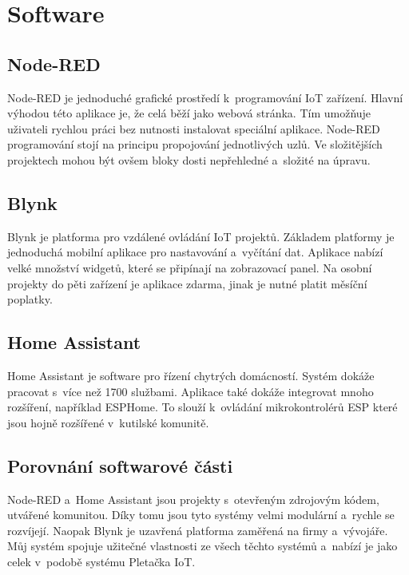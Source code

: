 \newpage

\section{Software}


\subsection{Node-RED}
Node-RED je jednoduché grafické prostředí k~programování IoT zařízení. 
Hlavní výhodou této aplikace je, že celá běží jako webová stránka. 
Tím umožňuje uživateli rychlou práci bez nutnosti instalovat speciální aplikace.
Node-RED programování stojí na principu propojování jednotlivých uzlů.
Ve složitějších projektech mohou být ovšem bloky dosti nepřehledné a~složité na úpravu.


\subsection{Blynk}
Blynk je platforma pro vzdálené ovládání IoT projektů.
Základem platformy je jednoduchá mobilní aplikace pro nastavování a~vyčítání dat.
Aplikace nabízí velké množství widgetů, které se připínají na zobrazovací panel.
Na osobní projekty do pěti zařízení je aplikace zdarma, jinak je nutné platit měsíční poplatky.


\subsection{Home Assistant}
Home Assistant je software pro řízení chytrých domácností. 
Systém dokáže pracovat s~více než 1700 službami.
Aplikace také dokáže integrovat mnoho rozšíření, například ESPHome.
To slouží k~ovládání mikrokontrolérů ESP které jsou hojně rozšířené v~kutilské komunitě.


\subsection{Porovnání softwarové části}
Node-RED a~Home Assistant jsou projekty s~otevřeným zdrojovým kódem, utvářené komunitou.
Díky tomu jsou tyto systémy velmi modulární a~rychle se rozvíjejí. %
Naopak Blynk je uzavřená platforma zaměřená na firmy a~vývojáře.
Můj systém spojuje užitečné vlastnosti ze všech těchto systémů a~nabízí je jako celek v~podobě systému Pletačka IoT.
